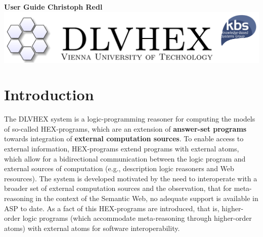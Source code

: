 \documentclass[14pt,a4paper, titlepage]{article}
\begin{document}
\setcounter{page}{3}
\newcommand{\dlvhex}{{\sc DLVHEX}}
\newcommand{\hex}{{\sc HEX}}



\begin{titlepage}
    \centering
    \vfill
    {\bfseries\Large
        User Guide
        \vskip2cm
        Christoph Redl\\
    }    
    \vfill
    \includegraphics{biglogo_whitebg}
    \vfill
    \vfill
\end{titlepage}

\begin{abstract}
This document provides a user guide for the Answer Set Programming(ASP) system called \dlvhex{} developed at Vienna University of Technology. ASP is a declarative problem solving paradigm, rooted in Logic Programming and Nonmonotonic Reasoning, which has been gaining increasing attention during the last years. The \dlvhex{} system is a logic-programming reasoner for computing the models of so-called \hex{}-programs, which are an extension of \textbf{answer-set programs} towards integration of \textbf{external computation sources}. This guide, aims at enabling users of this system to interoperate with a broader set of external computation sources since there is no adequate support available for the meta-reasoning in the context of the Semantic Web up to date. Using this guide ASP novices will be able to exploit Answer Set Programming and some of its tools as \dlvhex{}. The guide generally refers to the \textbf{dlvhex2} release. Please make sure that you are using corresponding(or later) versions available.     
\end{abstract}

\tableofcontents

\newpage

\section{Introduction} %
The \dlvhex{} system is a logic-programming reasoner for computing the models of so-called \hex{}-programs, which are an extension of \textbf{answer-set programs} towards integration of \textbf{external computation sources}. To enable access to external information, \hex{}-programs extend programs with external atoms, which allow for a bidirectional communication between the logic program and external sources of computation (e.g., description logic reasoners and Web resources). \cite{extatoms} The system is developed motivated by the need to interoperate with a broader set of external computation sources and the observation, that for meta-reasoning in the context of the Semantic Web, no adequate support is available in ASP to date. As a fact of this \hex{}-programs are introduced, that is, higher-order logic programs (which accommodate meta-reasoning through higher-order atoms) with external atoms for software interoperability.
\end{document}
